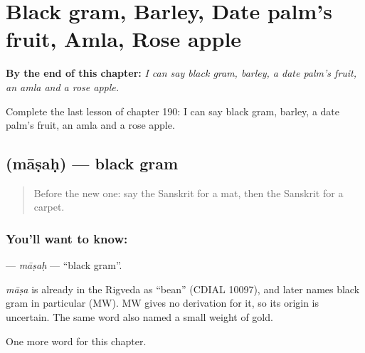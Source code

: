 
\chapter{Black gram, Barley, Date palm's fruit, Amla, Rose apple}
\label{ch:sa-black-gram-barley-date-palm-s-fruit-amla-rose-apple}

\begin{chapteropening}
\textbf{By the end of this chapter:} \emph{I can say black gram, barley, a date palm's fruit, an amla and a rose apple.}

Complete the last lesson of chapter 190: I can say black gram, barley, a date palm's fruit, an amla and a rose apple.
\end{chapteropening}

\section[\texorpdfstring{\sk{माषः} (māṣaḥ)}{माषः (māṣaḥ)}]{ (māṣaḥ) — black gram}

\label{lesson:SA-C190-masah}



\begin{quote}
Before the new one: say the Sanskrit for a mat, then the Sanskrit for a carpet.
\end{quote}

\subsection*{You'll want to know: }
\textbf{} — \emph{māṣaḥ} — \textquotedblleft{}black gram\textquotedblright{}.

\begin{cousinweb}
\emph{māṣa} is already in the Rigveda as \textquotedblleft{}bean\textquotedblright{} (CDIAL 10097), and later names black gram in particular (MW). MW gives no derivation for it, so its origin is uncertain. The same word also named a small weight of gold.
\end{cousinweb}

\begin{grammarlens}[title={What you've built}]
One more word for this chapter.
\end{grammarlens}


